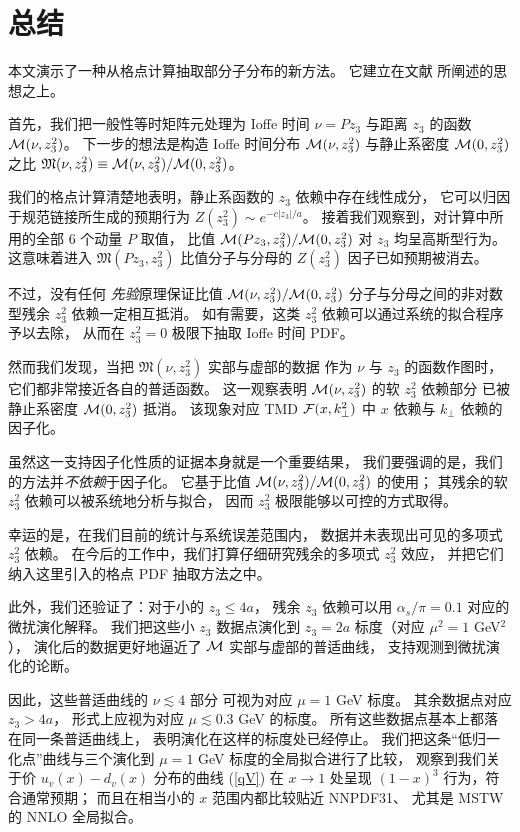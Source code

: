 \section{总结}

本文演示了一种从格点计算抽取部分子分布的新方法。
它建立在文献 \cite{Radyushkin:2017cyf} 所阐述的思想之上。

首先，我们把一般性等时矩阵元处理为 Ioffe 时间 $\nu = Pz_3$
与距离 $z_3$ 的函数 ${\cal M} (\nu, z_3^2)$。
下一步的想法是构造 Ioffe 时间分布 ${\cal M} (\nu, z_3^2)$
与静止系密度 ${\cal M} (0, z_3^2)$ 之比
${\mathfrak  M} (\nu, z_3^2) \equiv {\cal M} (\nu, z_3^2)/{\cal M} (0, z_3^2)$。


我们的格点计算清楚地表明，静止系函数的 $z_3$ 依赖中存在线性成分，
它可以归因于规范链接所生成的预期行为 $Z(z_3^2) \sim e^{-c|z_3|/a}$。
接着我们观察到，对计算中所用的全部 6 个动量 $P$ 取值，
比值 ${\cal M} (Pz_3 , z_3^2)/{\cal M} (0, z_3^2)$ 对 $z_3$ 均呈高斯型行为。
这意味着进入 ${\mathfrak  M} (Pz_3, z_3^2)$ 比值分子与分母的
$Z(z_3^2)$ 因子已如预期被消去。

不过，没有任何 {\it 先验}原理保证比值 ${\cal M} (\nu, z_3^2)/{\cal M} (0, z_3^2)$
分子与分母之间的非对数型残余 $z_3^2$ 依赖一定相互抵消。
如有需要，这类 $z_3^2$ 依赖可以通过系统的拟合程序予以去除，
从而在 $z_3^2=0$ 极限下抽取 Ioffe 时间 PDF。

然而我们发现，当把 ${\mathfrak  M} (\nu, z_3^2)$ 实部与虚部的数据
作为 $\nu$ 与 $z_3$ 的函数作图时，
它们都非常接近各自的普适函数。
这一观察表明 ${\cal M} (\nu, z_3^2)$ 的软 $z_3^2$ 依赖部分
已被静止系密度 ${\cal M} (0, z_3^2)$ 抵消。
该现象对应 TMD ${\cal F} (x, k_\perp^2)$ 中 $x$ 依赖与 $k_\perp$ 依赖的因子化。

虽然这一支持因子化性质的证据本身就是一个重要结果，
我们要强调的是，我们的方法并{\it 不依赖}于因子化。
它基于比值 ${\cal M} (\nu, z_3^2)/{\cal M} (0, z_3^2)$ 的使用；
其残余的软 $z_3^2$ 依赖可以被系统地分析与拟合，
因而 $z_3^2$ 极限能够以可控的方式取得。

幸运的是，在我们目前的统计与系统误差范围内，
数据并未表现出可见的多项式 $z_3^2$ 依赖。
在今后的工作中，我们打算仔细研究残余的多项式 $z_3^2$ 效应，
并把它们纳入这里引入的格点 PDF 抽取方法之中。

此外，我们还验证了：对于小的 $z_3 \leq 4a$，
残余 $z_3$ 依赖可以用 $\alpha_s/\pi =0.1$ 对应的微扰演化解释。
我们把这些小 $z_3$ 数据点演化到 $z_3=2a$ 标度（对应 $\mu^2=1$ GeV$^2$），
演化后的数据更好地逼近了 ${\cal M}$ 实部与虚部的普适曲线，
支持观测到微扰演化的论断。

因此，这些普适曲线的 $ \nu \lesssim 4$ 部分
可视为对应 $\mu=1$ GeV 标度。
其余数据点对应 $z_3 >4a$，
形式上应视为对应 $\mu \lesssim 0.3$ GeV 的标度。
所有这些数据点基本上都落在同一条普适曲线上，
表明演化在这样的标度处已经停止。
我们把这条“低归一化点”曲线与三个演化到 $\mu =1$ GeV 标度的全局拟合进行了比较，
观察到我们关于价 $u_v(x)- d_v (x)$ 分布的曲线 (\ref{qV})
在 $x \to 1$ 处呈现 $(1-x)^3$ 行为，符合通常预期；
而且在相当小的 $x$ 范围内都比较贴近 NNPDF31、
尤其是 MSTW 的 NNLO 全局拟合。


